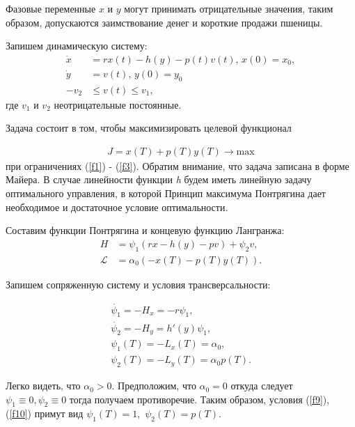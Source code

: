 Фазовые переменные $x$ и $y$ могут принимать отрицательные значения, таким образом, допускаются заимствование денег и короткие продажи пшеницы.



Запишем динамическую систему:
\begin{align}
    \Dot{x} & = r x(t) - h(y) - p(t) v(t),\, x(0) = x_{0}, \label{f1} \\
    \Dot{y} & = v(t), \, y(0) = y_{0} \label{f2}\\
    - v_2 & \le v(t) \le v_1, \label{f3}
\end{align}    
где $v_{1}$ и ${v_2}$ неотрицательные постоянные. 

Задача состоит в том, чтобы максимизировать целевой функционал

\begin{align}
    J = x(T) + p(T) y(T)\to \mathrm{max}
\end{align} 
при ограничениях (\ref{f1}) - (\ref{f3}). Обратим внимание, что задача записана в форме Майера. В случае линейности функции  \emph{h} будем иметь линейную задачу оптимального управления, в которой Принцип максимума Понтрягина дает необходимое и достаточное условие оптимальности.


Составим функции Понтрягина и концевую функцию Лангранжа: 
\begin{align}
    {H} & = \psi_{1} (r x - h(y) - p v) + \psi_{2} v,\\
    \mathcal{L} & = \alpha_{0} (-x(T) - p(T) y(T)).
\end{align} 


Запишем сопряженную систему и условия трансверсальности:

\begin{gather}
 \Dot{\psi_{1}} = -H_x = -r \psi_{1},\label{f7}\\
\Dot{\psi_{2}} = -H_y = h'(y) \psi_{1},\label{f8}\\ 
    {\psi_{1}(T)} = - {L}_x(T)=\alpha_{0},\label{f9}\\
    {\psi_{2}(T)} = - {L}_y(T)=\alpha_{0} p(T) \label{f10}.
\end{gather} 

Легко видеть, что $\alpha_{0} > 0 $. Предположим, что $ \alpha_{0} = 0$ откуда следует\\ $\psi_{1} \equiv 0, \psi_{2} \equiv 0 $ тогда получаем противоречие. Таким образом, условия (\ref{f9}), (\ref{f10})  примут вид $\psi_1(T) =1,$  $\psi_2(T)=p(T)$.

